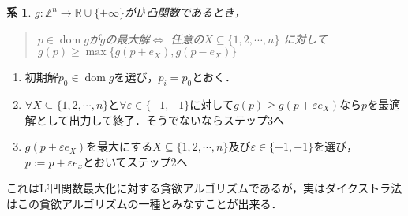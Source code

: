 \documentclass[uplatex]{jsarticle}
\newcommand{\Int}{\mathbb{Z}}
\newcommand{\Real}{\mathbb{R}}
\newcommand{\fundef}[3]{#1\colon #2 \to #3}
\DeclareMathOperator{\dom}{\mathrm{dom}}
\theoremstyle{break}
\newtheorem{cor}{系}[section]
\begin{document}
\begin{cor}
  $\fundef{g}{\Int^n}{\Real\cup \{+\infty\}}$がL$^\natural$凸関数であるとき，
  \begin{quote}
    $p\in \dom g$が$g$の最大解$\Leftrightarrow$ 任意の$X\subseteq \{1,2,\cdots,n\}$ に対して$g(p)\geq \max \{g(p+e_X),g(p-e_X)\}$
  \end{quote}
\end{cor}
\begin{enumerate}
  \item 初期解$p_0\in \dom g$を選び，$p_i = p_0$とおく．
  \item $\forall X\subseteq \{1,2,\cdots,n\}$と$\forall \varepsilon \in \{+1,-1\}$に対して$g(p)\geq g(p+\varepsilon e_X)$なら$p$を最適解として出力して終了．そうでないならステップ3へ
  \item $g(p+\varepsilon e_X)$を最大にする$X\subseteq \{1,2,\cdots,n\}$及び$\varepsilon \in \{+1,-1\}$を選び，$p := p+\varepsilon e_x$とおいてステップ2へ
\end{enumerate}
これはL$^\natural$凹関数最大化に対する貪欲アルゴリズムであるが，実はダイクストラ法はこの貪欲アルゴリズムの一種とみなすことが出来る．
\end{document}
